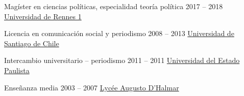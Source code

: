 \begin{yearlist}

\item[Magíster en ciencias políticas, especialidad teoría política ]{2017 -- 2018}
     {
     \href{https://formations.univ-rennes1.fr/formations/master-2-theorie-politique} {Universidad de Rennes 1}
     }
		 {}


\item[Licencia en comunicación social y periodismo ]{2008 -- 2013}
     {
     \href{http://periodismo.usach.cl/} {Universidad de Santiago de Chile}
     }
		 {}


\item[Intercambio universitario -- periodismo ]{2011 -- 2011}
     {
     \href{http://www.unesp.br/} {Universidad del Estado \\ Paulista}
     }
		 {}
		 
\item[Enseñanza media]{2003 \hspace{-0.06cm}-- \hspace{-0.06cm}2007}
     {
     \href{www.liceoaugustodhalmar.cl/liceo}{Lycée Augusto D'Halmar}
     }
		 {}	


\end{yearlist}





%
%



